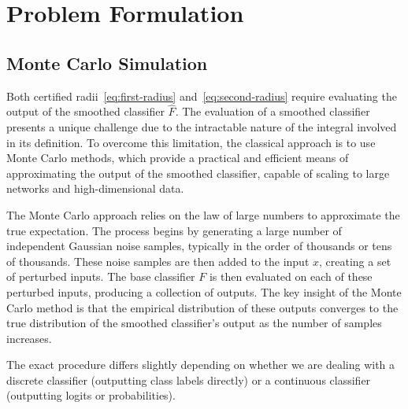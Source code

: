 \section{Problem Formulation}\label{sec:problem-formulation}

\subsection{Monte Carlo Simulation}\label{subsec:monte-carlo-simulation}

Both certified radii~\eqref{eq:first-radius} and~\eqref{eq:second-radius} require evaluating the output of the smoothed classifier $\hat{F}$.
The evaluation of a smoothed classifier presents a unique challenge due to the intractable nature of the integral involved in its definition.
To overcome this limitation, the classical approach is to use Monte Carlo methods, which provide a practical and efficient means of approximating the output of the smoothed classifier, capable of scaling to large networks and high-dimensional data.

The Monte Carlo approach relies on the law of large numbers to approximate the true expectation.
The process begins by generating a large number of independent Gaussian noise samples, typically in the order of thousands or tens of thousands.
These noise samples are then added to the input $x$, creating a set of perturbed inputs.
The base classifier $F$ is then evaluated on each of these perturbed inputs, producing a collection of outputs.
The key insight of the Monte Carlo method is that the empirical distribution of these outputs converges to the true distribution of the smoothed classifier's output as the number of samples increases.

The exact procedure differs slightly depending on whether we are dealing with a discrete classifier (outputting class labels directly) or a continuous classifier (outputting logits or probabilities).

